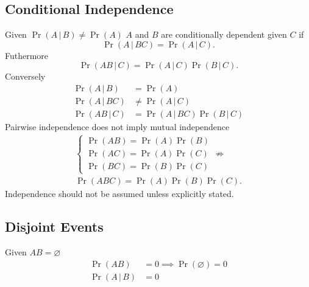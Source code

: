 \documentclass{article}
\begin{document}
\begin{multicols}{3}
    \subsection{Conditional Independence}
    Given \(\Pr{\left( A \,\vert\, B \right)} \neq \Pr{\left( A \right)}\)
    \(A\) and \(B\) are conditionally dependent given \(C\) if
    \begin{equation*}
        \Pr{\left( A \,\vert\, BC \right)} = \Pr{\left( A \,\vert\, C \right)}.
    \end{equation*}
    Futhermore
    \begin{equation*}
        \Pr{\left( AB \,\vert\, C \right)} = \Pr{\left( A \,\vert\, C \right)} \Pr{\left( B \,\vert\, C \right)}.
    \end{equation*}
    Conversely
    \begin{align*}
        \Pr{\left( A \,\vert\, B \right)}  & = \Pr{\left( A \right)}                                                \\
        \Pr{\left( A \,\vert\, BC \right)} & \neq \Pr{\left( A \,\vert\, C \right)}                                 \\
        \Pr{\left( AB \,\vert\, C \right)} & = \Pr{\left( A \,\vert\, BC \right)} \Pr{\left( B \,\vert\, C \right)}
    \end{align*}
    Pairwise independence does not imply mutual independence
    \begin{gather*}
        \begin{cases}
            \Pr{\left( A B \right)} = \Pr{\left( A \right)} \Pr{\left( B \right)} \\
            \Pr{\left( A C \right)} = \Pr{\left( A \right)} \Pr{\left( C \right)} \\
            \Pr{\left( B C \right)} = \Pr{\left( B \right)} \Pr{\left( C \right)}
        \end{cases} \not\Rightarrow                                                                          \\
        \Pr{\left( A B C \right)} = \Pr{\left( A \right)} \Pr{\left( B \right)} \Pr{\left( C \right)}.
    \end{gather*}
    Independence should not be assumed unless explicitly stated.
    \subsection{Disjoint Events}
    Given \(AB = \varnothing\)
    \begin{align*}
        \Pr{\left( AB \right)}            & = 0 \implies \Pr{\left( \varnothing \right)} = 0 \\
        \Pr{\left( A \,\vert\, B \right)} & = 0
    \end{align*}

\end{multicols}
\end{document}
